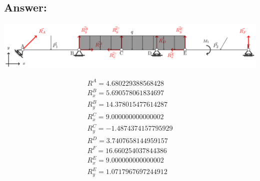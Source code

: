 \subsection*{Answer:}

\includegraphics[width=\linewidth]{graphics/task1final.pdf}

\begin{answer}
    \begin{align*}
        R^{A} = 4.680229388568428     \\
        R^{B}_x = 5.690578061834697   \\
        R^{B}_y = 14.378015477614287  \\
        R^{C}_x = 9.000000000000002   \\
        R^{C}_y = -1.4874374157795929 \\
        R^{D} = 3.7407658144959157    \\
        R^{F} = 16.660254037844386    \\
        R^{E}_x = 9.000000000000002   \\
        R^{E}_y = 1.0717967697244912
    \end{align*}

\end{answer}

